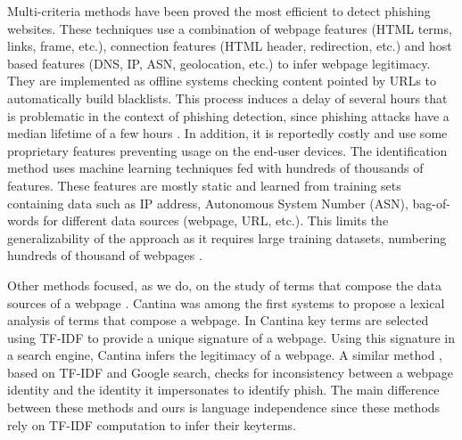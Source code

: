 \documentclass[10pt,conference,compsocconf,letterpaper]{IEEEtran}
\begin{document}
Multi-criteria methods \cite{thomas:2011:design,whittaker:2010:large} have been proved the most efficient to detect phishing websites.
These techniques use a combination of webpage features (HTML terms, links, frame, etc.), connection features (HTML header, redirection, etc.) and host based features (DNS, IP, ASN, geolocation, etc.) to infer webpage legitimacy. They are implemented as offline systems checking content pointed by URLs to automatically build blacklists. This process induces a delay of several hours \cite{whittaker:2010:large} that is problematic in the context of phishing detection, since phishing attacks have a median lifetime of a few hours \cite{apwg:2015}. In addition, it is reportedly costly \cite{thomas:2011:design} and use \cite{whittaker:2010:large} some proprietary features preventing usage on the end-user devices. The identification method uses machine learning techniques fed with hundreds of thousands of features. These features are mostly static and learned from training sets containing data such as IP address, Autonomous System Number (ASN), bag-of-words for different data sources (webpage, URL, etc.).
This limits the generalizability of the approach as it requires large training datasets, numbering hundreds of thousand of webpages \cite{whittaker:2010:large}.
 
Other methods focused, as we do, on the study of terms that compose the data sources of a webpage \cite{le:2011:phishdef,marchal:2014:phishstorm}. 
Cantina \cite{xiang:2011:cantina,zhang:2007:cantina} was among the first systems to propose a lexical analysis of terms that compose a webpage. In Cantina \cite{zhang:2007:cantina} key terms are selected  using TF-IDF to provide a unique signature of a webpage. Using this signature in a  search engine, Cantina infers the legitimacy of a webpage. A similar method \cite{Xiang:2009:hybrid}, based on TF-IDF and Google search, checks for inconsistency between a webpage identity and the identity it impersonates to identify phish. The main difference between these methods and ours is language independence since these methods rely on TF-IDF computation to infer their keyterms.
\end{document}
